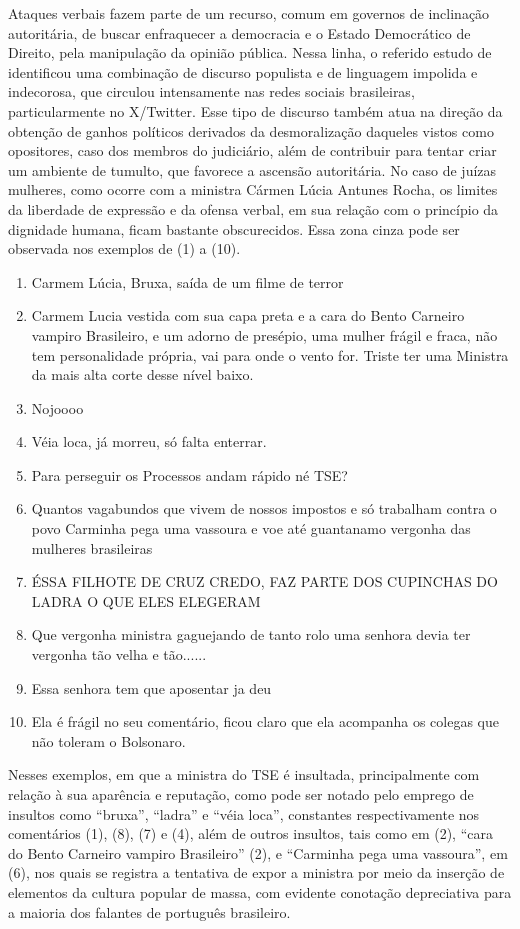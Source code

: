 \documentclass[portuguese]{textolivre}
\begin{document}
Ataques verbais fazem parte de um recurso, comum em governos de inclinação autoritária, de buscar enfraquecer a democracia e o Estado Democrático de Direito, pela manipulação da opinião pública. Nessa linha, o referido estudo de \textcite{oliveira2024} identificou uma combinação de discurso populista e de linguagem impolida e indecorosa, que circulou intensamente nas redes sociais brasileiras, particularmente no X/Twitter. Esse tipo de discurso também atua na direção da obtenção de ganhos políticos derivados da desmoralização daqueles vistos como opositores, caso dos membros do judiciário, além de contribuir para tentar criar um ambiente de tumulto, que favorece a ascensão autoritária. No caso de juízas mulheres, como ocorre com a ministra Cármen Lúcia Antunes Rocha, os limites da liberdade de expressão e da ofensa verbal, em sua relação com o princípio da dignidade humana, ficam bastante obscurecidos. Essa zona cinza pode ser observada nos exemplos de (1) a (10).
\medskip
\begin{enumerate}
    \item Carmem Lúcia, Bruxa, saída de um filme de terror
    \item Carmem Lucia vestida com sua capa preta e a cara do Bento Carneiro vampiro Brasileiro, e um adorno de presépio, uma mulher frágil e fraca, não tem personalidade própria, vai para onde o vento for. Triste ter uma Ministra da mais alta corte desse nível baixo.
    \item Nojoooo {\Symbola 🤮🤮🤮🤮}
    \item Véia loca, já morreu, só falta enterrar.
    \item Para perseguir os Processos andam rápido né TSE?
    \item Quantos vagabundos que vivem de nossos impostos e só trabalham contra o povo Carminha pega uma vassoura e voe até guantanamo vergonha das mulheres brasileiras
    \item ÉSSA FILHOTE DE CRUZ CREDO, FAZ PARTE DOS CUPINCHAS DO LADRA O QUE ELES ELEGERAM
    \item Que vergonha ministra gaguejando de tanto rolo uma senhora devia ter vergonha tão velha e tão......
    \item Essa senhora tem que aposentar ja deu
    \item Ela é frágil no seu comentário, ficou claro que ela acompanha os colegas que não toleram o Bolsonaro.
\end{enumerate}
\medskip

Nesses exemplos, em que a ministra do TSE é insultada, principalmente com relação à sua aparência e reputação, como pode ser notado pelo emprego de insultos como ``bruxa'', ``ladra'' e ``véia loca'', constantes respectivamente nos comentários (1), (8), (7) e (4), além de outros insultos, tais como em (2), ``cara do Bento Carneiro vampiro Brasileiro'' (2), e ``Carminha pega uma vassoura'', em (6), nos quais se registra a tentativa de expor a ministra por meio da inserção de  elementos da cultura popular de massa, com evidente conotação depreciativa para a maioria dos falantes de português brasileiro.
\end{document}
